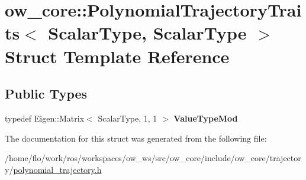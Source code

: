 \hypertarget{structow__core_1_1PolynomialTrajectoryTraits_3_01ScalarType_00_01ScalarType_01_4}{}\section{ow\+\_\+core\+:\+:Polynomial\+Trajectory\+Traits$<$ Scalar\+Type, Scalar\+Type $>$ Struct Template Reference}
\label{structow__core_1_1PolynomialTrajectoryTraits_3_01ScalarType_00_01ScalarType_01_4}
\subsection*{Public Types}
\begin{DoxyCompactItemize}
\item 
typedef Eigen\+::\+Matrix$<$ Scalar\+Type, 1, 1 $>$ {\bfseries Value\+Type\+Mod}\hypertarget{structow__core_1_1PolynomialTrajectoryTraits_3_01ScalarType_00_01ScalarType_01_4_a1cffd7138355c467e81f88104ba2c4f0}{}\label{structow__core_1_1PolynomialTrajectoryTraits_3_01ScalarType_00_01ScalarType_01_4_a1cffd7138355c467e81f88104ba2c4f0}

\end{DoxyCompactItemize}


The documentation for this struct was generated from the following file\+:\begin{DoxyCompactItemize}
\item 
/home/flo/work/ros/workspaces/ow\+\_\+ws/src/ow\+\_\+core/include/ow\+\_\+core/trajectory/\hyperlink{polynomial__trajectory_8h}{polynomial\+\_\+trajectory.\+h}\end{DoxyCompactItemize}
